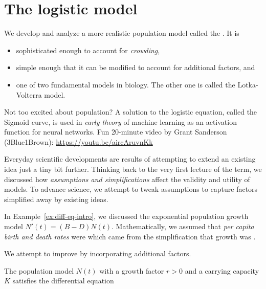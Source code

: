 \documentclass[../main.tex]{subfiles}
\begin{document}
 \section{The logistic model}

We develop and analyze a more realistic population model called the .  It is
\begin{itemize}
  \item sophisticated enough to account for \emph{crowding}, 
  \item simple enough that it can be modified to account for additional factors, and
  \item one of two fundamental models in biology. The other one is called the Lotka-Volterra model.
\end{itemize}

{\footnotesize \faYoutube{} Not too excited about population? A solution to the logistic equation, called the Sigmoid curve, is used in \emph{early theory} of machine learning as an activation function for neural networks. Fun 20-minute video by Grant Sanderson (3Blue1Brown): \url{https://youtu.be/aircAruvnKk}}

Everyday scientific developments are results of attempting to extend an existing idea just a tiny bit further.  Thinking back to the very first lecture of the term, we discussed how \emph{assumptions and simplifications} affect the validity and utility of models.  To advance science, we attempt to tweak assumptions to capture factors simplified away by existing ideas. 

In Example~\ref{ex:diff-eq-intro}, we discussed the exponential population growth model \(N'(t) = (B - D) N(t)\). Mathematically, we assumed that \emph{per capita birth and death rates} were \underline{\hspace{2in}} which came from the simplification that growth was \underline{\hspace{1.5in}}. 

We attempt to improve by incorporating additional factors. 

\begin{definition}
  The population model \(N(t)\) with a growth factor \(r > 0\) and a carrying capacity \(K\) satisfies the differential equation
  \begin{equation} \label{eq:diff-eq-logistic}
    \phantom{N'(t) = r N(t) \left( 1 - \frac{K}{N(t)} \right).}
  \end{equation}
\end{definition}
\end{document}
